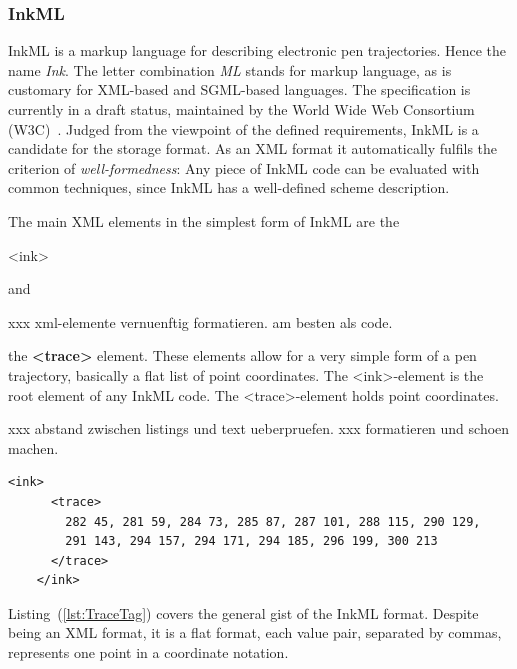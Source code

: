 \subsubsection{InkML}
\label{sec:hwre:inkml}

InkML is a markup language for describing electronic pen trajectories. 
Hence the name \emph{Ink}. The letter combination \emph{ML} stands for markup 
language, as is customary 
for XML-based and SGML-based languages. The specification is currently in a 
draft status, maintained by the World Wide Web Consortium 
(W3C)~. 
Judged from the viewpoint of the defined requirements, InkML is a candidate
for the storage format. As an XML format it automatically fulfils the
criterion of \emph{well-formedness}: Any piece of InkML code can be evaluated 
with common techniques, since InkML has a well-defined scheme description.

The main XML elements in the simplest form of InkML are the \begin{xmlcode}<ink>\end{xmlcode} and

xxx xml-elemente vernuenftig formatieren. am besten als code.

 
the \textbf{<trace>} element. These elements allow for a very simple form 
of a pen trajectory, basically a flat list of point coordinates. The 
<ink>-element is the root element of any InkML code. The <trace>-element holds
point coordinates.

xxx abstand zwischen listings und text ueberpruefen.
xxx formatieren und schoen machen.

\begin{xmlcode}
  \begin{lstlisting}[emph={trace},emphstyle=\textbf,caption={Demonstration of the \emph{trace} tag},label=lst:TraceTag]
    <ink>
      <trace>
        282 45, 281 59, 284 73, 285 87, 287 101, 288 115, 290 129,
        291 143, 294 157, 294 171, 294 185, 296 199, 300 213
      </trace>
    </ink>
  \end{lstlisting}
\end{xmlcode}
Listing~(\ref{lst:TraceTag}) covers the general gist of the InkML format.
Despite being an XML format, it is a flat format, each value pair, 
separated by commas, represents one point in a coordinate notation.

